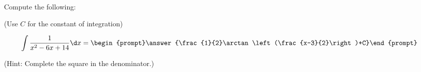 \documentclass{ximera}
\author{Jim Talamo}
\begin{document}
\begin{exercise}
Compute the following:

\begin{prompt} (Use $C$ for the constant of integration) \end{prompt}

\[
\int \frac{1}{x^2-6x+14} \d x =
\begin{prompt}\answer{\frac{1}{2}\arctan\left(\frac{x-3}{2}\right)+C}\end{prompt} \\
\]

\begin{prompt} (Hint: Complete the square in the denominator.) \end{prompt}
\end{exercise}
\end{document}
